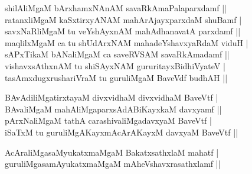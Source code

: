 \begin{entry}
\begin{shl}
shilAliMgaM bArxhamxNAnAM savaRkAmaPalaparxdamf ||\\[2pt]
ratanxliMgaM kaSxtirxyANAM mahArAjayxparxdaM shuBamf |\\[2pt]
savxNaRliMgaM tu veYshAyxnAM mahAdhanavatA parxdamf ||\\[2pt]
maqlilxMgaM ca tu shUdArxNAM mahadeYshavxyaRdaM viduH |\\[2pt]
sAPxTikaM bANaliMgaM ca saveRVSAM savaRkAmadamf ||\\[2pt]
vishavxsAthxnAM tu shiSAyxNAM gururitayxBidhiVyateV |\\[2pt]
tasAmxdugxrushariVraM tu guruliMgaM BaveVdf budhAH ||\\[-1pt]
\end{shl}
\medskip
{}
\smallskip
{}
\medskip
\begin{shl}
BAvAdiliMgatirxtayaM divxvidhaM divxvidhaM BaveVtf |\\[2pt]
BAvaliMgaM mahAliMgaparxsAdABiKayxkaM davxyamf ||\\[2pt]
pArxNaliMgaM tathA carashivaliMgadavxyaM BaveVtf |\\[2pt]
iSaTxM tu guruliMgAKayxmAcArAKayxM davxyaM BaveVtf ||\\[-1pt]
\end{shl}
\medskip
{}
\medskip
\begin{shl}
AcAraliMgasaMyukatxmaMgaM BakatxsathxlaM mahatf |\\[2pt]
guruliMgasamAyukatxmaMgaM mAheVshavxrasathxlamf ||
\end{shl}


\end{entry}
